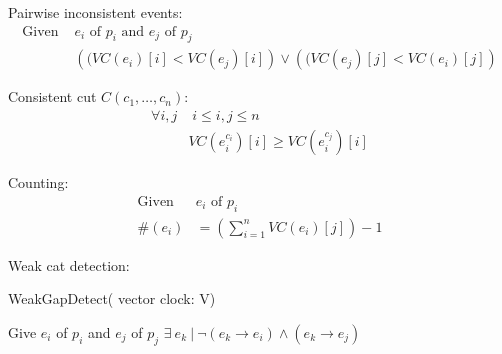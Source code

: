 \documentclass[]{article}
\begin{document}
Pairwise inconsistent events:
\begin{align*}
\text{Given }&e_i \text{ of }p_i \text{ and } e_j \text{ of }p_j\\
&\left((VC(e_i)[i] < VC(e_j)[i]\right) \vee \left((VC(e_j)[j] < VC(e_i)[j]\right)
\end{align*}

Consistent cut $C(c_1, \dots , c_n)$:
\begin{align*}
\forall i,j &\; i\leq i,j \leq n\\
&VC(e_i^{c_i})[i] \geq VC(e_i^{c_j})[i]
\end{align*}

Counting:
\begin{align*}
\text{Given }&e_i \text{ of }p_i\\
\#(e_i) &= \left(\sum_{i=1}^{n}VC(e_i)[j]\right) -1 
\end{align*}

Weak cat detection:
\begin{algorithm}[H]
\caption{WeakGapDetect( vector clock: V)}
\label{alg:weakGap}
\begin{algorithmic}
\STATE Give $e_i$ of $p_i$ and $e_j$ of $p_j$
	\STATE $\exists\ e_k\ |\ \neg (e_k \rightarrow e_i) \wedge (e_k \rightarrow e_j)$
\ENDIF
{}
\end{algorithmic}
\end{algorithm}
\end{document}
